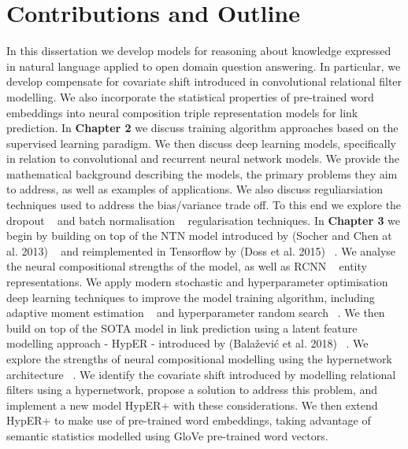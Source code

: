 
\section{Contributions and Outline} %

In this dissertation we develop models for reasoning about knowledge expressed in natural language applied to open domain question answering. In particular, we develop compensate for covariate shift introduced in convolutional relational filter modelling. We also incorporate the statistical properties of pre-trained word embeddings into neural composition triple representation models for link prediction. \newline
In \textbf{Chapter 2} we discuss training algorithm approaches based on the supervised learning paradigm. We then discuss deep learning models, specifically in relation to convolutional and recurrent neural network models. We provide the mathematical background describing the models, the primary problems they aim to address, as well as examples of applications. We also discuss reguliarsiation techniques used to address the bias/variance trade off. To this end we explore the dropout ~\citep{srivastava2014dropout} and batch normalisation ~\citep{ioffe2015batch} regularisation techniques.   \newline
In \textbf{Chapter 3} we begin by building on top of the NTN model introduced by (Socher and Chen at al. 2013) ~\citep{socher2013reasoning} and reimplemented in Tensorflow by (Doss et al. 2015) ~\citep{Doss2015}. We analyse the neural compositional strengths of the model, as well as RCNN ~\citep{socher2012semantic} entity representations.  We apply modern stochastic and hyperparameter optimisation deep learning techniques to improve the model training algorithm, including adaptive moment estimation ~\citep{kingma2014adam} and hyperparameter random search ~\citep{bergstra2012random}. We then build on top of the SOTA model in link prediction using a latent feature modelling approach - HypER - introduced by (Bala\v{z}evi\'c et al. 2018) ~\citep{balazevic2019hypernetwork}. We explore the strengths of neural compositional modelling using the hypernetwork architecture ~\citep{ha2016hypernetworks}. We identify the covariate shift introduced by modelling relational filters using a hypernetwork, propose a solution to address this problem, and implement a new model HypER+ with these considerations. We then extend HypER+ to make use of pre-trained word embeddings, taking advantage of semantic statistics modelled using GloVe pre-trained word vectors. \newline
